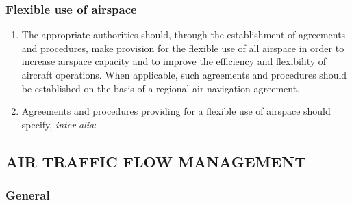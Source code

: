 
\subsubsection{Flexible use of airspace}

\begin{enumerate}
    \item The appropriate authorities should, through the establishment of agreements and procedures, make provision for the flexible use of all airspace in order to increase airspace capacity and to improve the efficiency and flexibility of aircraft operations. When applicable, such agreements and procedures should be established on the basis of a regional air navigation agreement.
    \item Agreements and procedures providing for a flexible use of airspace should specify, \textit{inter alia}:
    
\end{enumerate}

\subsection[Air traffic flow management]{AIR TRAFFIC FLOW MANAGEMENT}

\subsubsection{General}

